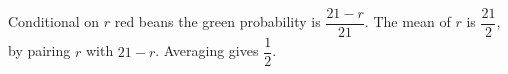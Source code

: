 Conditional on $r$ red beans the green probability is $\dfrac{21-r}{21}$. The mean of $r$ is $\dfrac{21}{2}$, by pairing $r$ with $21-r$. Averaging gives $\boxed{\dfrac{1}{2}}$.
